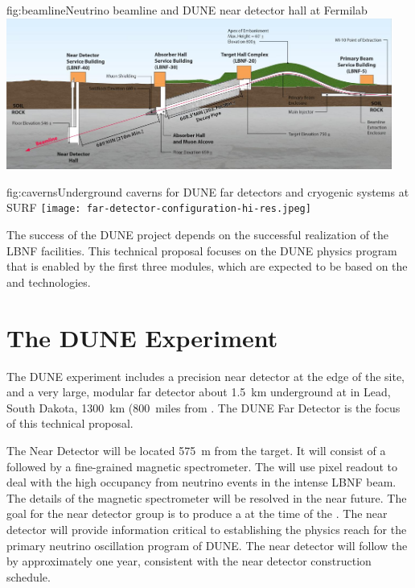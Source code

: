 \begin{dunefigure}{fig:beamline}{Neutrino beamline and DUNE near detector hall at Fermilab}
\includegraphics[width=0.95\textwidth]{figures/beamline-sideview.jpg}

\end{dunefigure}

\begin{dunefigure}{fig:caverns}{Underground caverns for DUNE far detectors and cryogenic systems at SURF}
\texttt{[image: far-detector-configuration-hi-res.jpeg]}
\end{dunefigure}

The success of the DUNE project depends on the successful realization of the LBNF facilities.
This technical proposal focuses on the DUNE physics program that is enabled by
the first three  modules, which are expected to be based on the \single and \dual \lar technologies. 

\section{The DUNE Experiment} %


The DUNE experiment includes a precision near detector at the edge of the \fnal site, and a very large, modular far detector about \SI{1.5}{km} underground at \surf in Lead, South Dakota, \SI{1300}{km} (\SI{800}{miles} from \fnal. The DUNE Far Detector is the focus of this technical proposal. 

The Near Detector will be located \SI{575}{m} from the target. It will consist of a \lartpc followed by a fine-grained magnetic spectrometer. The \lartpc will use pixel readout to deal with the high occupancy from neutrino events in the intense LBNF beam. The details of the magnetic spectrometer will be resolved in the near future. The goal for the near detector group is to produce a  at the time of the  . The near detector  will provide information critical to establishing the physics reach for the primary neutrino oscillation program of DUNE. The near detector  will follow the   by approximately one year, consistent with the near detector construction schedule.

